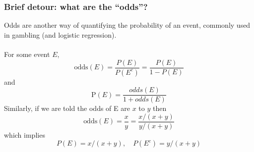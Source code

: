 \documentclass[table]{beamer}\usepackage[]{graphicx}\usepackage[]{color}
\begin{document}

% 
% 
% 
% 


\begin{frame}
\frametitle{Brief detour: what are the ``odds''?}

\vspace{-2mm}

Odds are another way of quantifying the probability of an event, commonly used in gambling (and logistic regression).\\

~\\

{
For some event $E$,
{\small
\[\text{odds}(E) = \frac{P(E)}{P(E^c)} = \frac{P(E)}{1-P(E)}\]
}
and
{\small
\[\text{P}(E) = \frac{odds(E)}{1+odds(E)}\]
}
Similarly, if we are told the odds of E are $x$ to $y$ then
{\small
\[\text{odds}(E) = \frac{x}{y} = \frac{x/(x+y)}{y/(x+y)} \]
}
which implies
{\small
\[P(E) = x/(x+y),\quad P(E^c) = y/(x+y)\]
}
}

\end{frame}



\end{document}
